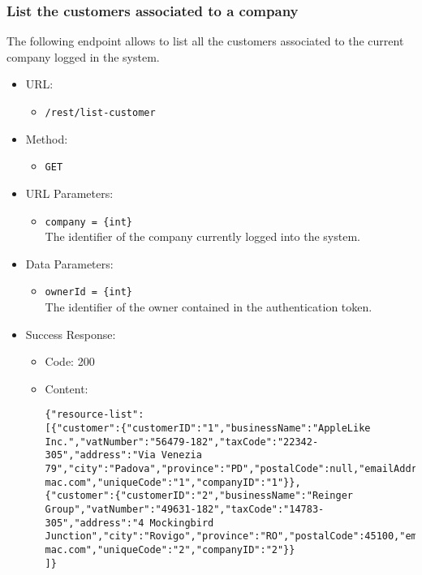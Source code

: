 \subsubsection*{List the customers associated to a company}

The following endpoint allows to list all the customers associated to the current company logged in the system.

\begin{itemize}
    
    \item URL: 
    \begin{itemize}
        \item \texttt{/rest/list-customer}
    \end{itemize}
    
    \item Method: 
    \begin{itemize}
        \item \texttt{GET}
    \end{itemize}
    
    \item URL Parameters: 
    \begin{itemize}
        \item \texttt{company = \{int\}} \\
        The identifier of the company currently logged into the system.
    \end{itemize}
    
    \item Data Parameters: 
    \begin{itemize}
        \item \texttt{ownerId = \{int\}} \\
        The identifier of the owner contained in the authentication token.
    \end{itemize}
    
    \item Success Response: 
    \begin{itemize}
        \item Code: 200
        \item Content:
        \begin{lstlisting}
{"resource-list":
[{"customer":{"customerID":"1","businessName":"AppleLike Inc.","vatNumber":"56479-182","taxCode":"22342-305","address":"Via Venezia 79","city":"Padova","province":"PD","postalCode":null,"emailAddress":"applelike@google.com","pec":"applelike@pec-mac.com","uniqueCode":"1","companyID":"1"}},
{"customer":{"customerID":"2","businessName":"Reinger Group","vatNumber":"49631-182","taxCode":"14783-305","address":"4 Mockingbird Junction","city":"Rovigo","province":"RO","postalCode":45100,"emailAddress":"rfrankum1@google.nl","pec":"plyster1@pec-mac.com","uniqueCode":"2","companyID":"2"}}
]}
        \end{lstlisting}    
    \end{itemize}
    

\end{itemize}
